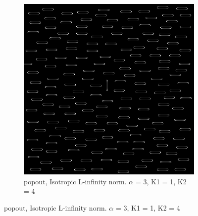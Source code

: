 \begin{figure}[H]
  \centering  
  
    \begin{subfigure}{.7\textwidth}
    \centering
    \includegraphics[width=.9\textwidth]{./canny/popout_LINF_a3_k11_k24}
    \caption{popout, Isotropic L-infinity norm. $\alpha$ = 3, K1 = 1, K2 = 4}
    \label{fig:popout_LINF_a3_k11_k24}
  \end{subfigure}%

\end{figure}

